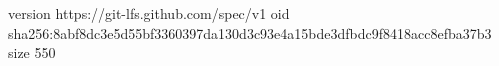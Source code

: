 version https://git-lfs.github.com/spec/v1
oid sha256:8abf8dc3e5d55bf3360397da130d3c93e4a15bde3dfbdc9f8418acc8efba37b3
size 550

